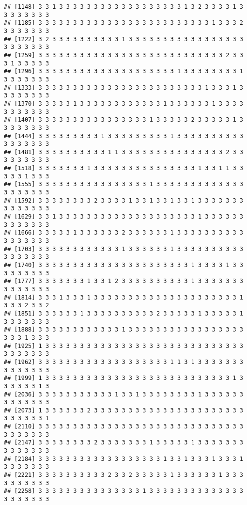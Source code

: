 \documentclass[
]{article}
\begin{document}
\begin{verbatim}
## [1148] 3 3 1 3 3 3 3 3 3 3 3 3 3 3 3 3 3 3 3 3 3 1 3 2 3 3 3 3 1 3 3 3 3 3 3 3 3
## [1185] 3 3 3 3 3 3 3 3 3 3 3 3 3 3 3 3 3 3 3 3 3 3 3 3 3 1 3 3 3 2 3 3 3 3 3 3 3
## [1222] 3 2 3 3 3 3 3 3 3 3 3 3 1 3 3 3 3 3 3 3 3 3 3 3 3 3 3 3 3 3 3 3 3 3 3 3 3
## [1259] 3 3 3 3 3 3 3 3 3 3 3 3 3 3 3 3 3 3 3 3 3 3 3 3 3 3 3 2 3 3 3 1 3 3 3 3 3
## [1296] 3 3 3 3 3 3 3 3 3 3 3 3 3 3 3 3 3 3 3 3 1 3 3 3 3 3 3 3 3 1 3 3 3 3 3 3 3
## [1333] 3 3 3 3 3 3 3 3 3 3 3 3 3 3 3 3 3 3 3 3 3 3 3 3 1 3 3 3 1 3 3 3 3 3 3 3 3
## [1370] 3 3 3 3 3 1 3 3 3 3 3 3 3 3 3 3 3 3 1 3 3 3 3 3 3 1 3 3 3 3 3 3 3 3 3 3 3
## [1407] 3 3 3 3 3 3 3 3 3 3 3 3 3 3 3 3 1 3 3 3 3 3 2 3 3 3 3 3 1 3 3 3 3 3 3 3 3
## [1444] 3 3 3 3 3 3 3 3 3 1 3 3 3 3 3 3 3 3 3 1 3 3 3 3 3 3 3 3 3 3 3 3 3 3 3 3 3
## [1481] 3 3 3 3 3 3 3 3 3 3 1 1 3 3 3 3 3 3 3 3 3 3 3 3 3 3 3 2 3 3 3 3 3 3 3 3 3
## [1518] 3 3 3 3 3 3 3 1 3 3 3 3 3 3 3 3 3 3 3 3 3 3 3 1 3 3 1 1 3 3 3 3 3 1 3 3 3
## [1555] 3 3 3 3 3 3 3 3 3 3 3 3 3 3 3 3 1 3 3 3 3 3 3 3 3 3 3 3 3 3 3 3 3 3 3 3 3
## [1592] 3 3 3 3 3 3 3 3 2 3 3 3 3 1 3 3 1 3 3 1 3 3 1 3 3 3 3 3 3 3 3 3 3 3 3 3 3
## [1629] 3 3 1 3 3 3 3 3 3 3 3 3 3 3 3 3 3 3 3 3 3 3 3 1 3 3 3 3 3 3 3 3 3 3 3 3 3
## [1666] 3 3 3 3 3 1 3 3 3 3 3 3 2 3 3 3 3 3 3 1 3 3 3 3 3 3 3 3 3 3 3 3 3 3 3 3 3
## [1703] 3 3 3 3 3 3 3 3 3 3 3 3 1 3 3 3 3 3 3 1 3 3 3 3 3 3 3 3 3 3 3 3 3 3 3 3 3
## [1740] 3 3 3 3 3 3 3 3 3 3 3 3 3 3 3 3 3 3 3 3 3 3 1 3 3 3 3 1 3 3 3 3 3 3 3 3 3
## [1777] 3 3 3 3 3 3 3 1 3 3 1 2 3 3 3 3 3 3 3 3 3 3 1 3 3 3 3 3 3 3 3 3 3 3 3 3 3
## [1814] 3 3 3 1 3 3 3 1 3 3 3 3 3 3 3 3 3 3 3 3 3 3 3 3 3 3 3 3 3 1 3 3 3 2 3 3 2
## [1851] 3 3 3 3 3 3 1 3 3 3 3 3 3 3 3 3 3 2 3 3 3 3 3 1 3 3 3 3 3 1 3 3 3 3 3 3 3
## [1888] 3 3 3 3 3 3 3 3 3 3 3 3 1 3 3 3 3 3 3 3 3 3 3 3 3 3 3 3 3 3 3 3 3 1 3 3 3
## [1925] 1 3 3 3 3 3 3 3 3 3 3 3 3 3 3 3 3 3 3 3 3 3 3 3 3 3 3 3 3 3 3 3 3 3 3 3 3
## [1962] 3 3 3 3 3 3 3 3 3 3 3 3 3 3 3 3 3 3 3 1 1 3 1 3 3 3 3 3 3 3 3 3 3 3 3 3 3
## [1999] 1 3 3 3 3 3 3 3 3 3 3 3 3 3 3 3 3 3 3 3 3 3 3 3 3 3 3 3 1 3 3 3 3 3 3 1 3
## [2036] 3 3 3 3 3 3 3 3 3 3 3 1 3 3 1 3 3 3 3 3 3 3 3 1 3 3 3 3 3 3 3 3 3 3 3 3 3
## [2073] 1 3 3 3 3 3 3 2 3 3 3 3 3 3 3 3 3 3 3 3 3 3 3 3 3 3 3 3 3 3 3 3 3 3 3 3 1
## [2110] 3 3 3 3 3 3 3 3 3 3 3 3 3 3 3 3 3 3 3 3 3 3 3 3 3 3 3 3 3 3 3 3 3 3 3 3 3
## [2147] 3 3 3 3 3 3 3 3 2 3 3 3 3 3 3 3 1 3 3 3 3 3 1 3 3 3 3 3 3 3 3 3 3 3 3 3 3
## [2184] 3 3 3 3 3 3 3 3 3 3 3 3 3 3 3 3 3 3 1 3 3 1 3 3 3 1 3 3 3 1 3 3 3 3 3 3 3
## [2221] 3 3 3 3 3 3 3 3 3 3 2 3 3 2 3 3 3 3 3 1 3 3 3 3 3 3 1 3 3 3 3 3 3 3 3 3 3
## [2258] 3 3 3 3 3 3 3 3 3 3 3 3 3 3 3 1 3 3 3 3 3 3 3 3 3 3 3 3 3 3 3 3 3 3 3 3 3

\end{verbatim}
\end{document}
